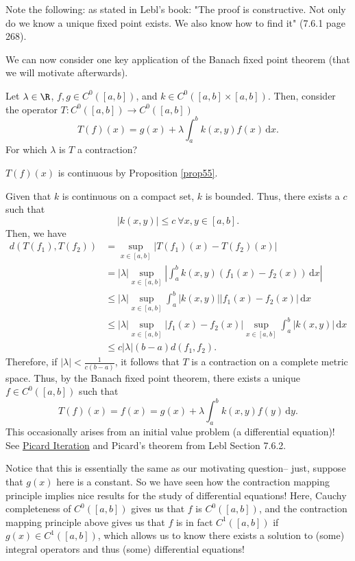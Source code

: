 Note the following: as stated in Lebl's book: "The proof is constructive. Not only do we know a unique fixed point exists. We also know how to find it" (7.6.1 page 268). 

We can now consider one key application of the Banach fixed point theorem (that we will motivate afterwards).

\begin{example}
Let $\lambda \in \R$, $f,g\in C^0([a,b])$, and $k \in C^0([a,b]\times [a,b])$. Then, consider the operator $T: C^0([a,b])\to C^0([a,b])$
\[
T(f)(x) = g(x) + \lambda \int_a^b k(x,y) f(x)\,\mathrm dx.
\]
For which $\lambda$ is $T$ a contraction?
\end{example}

\begin{remark}
    $T(f)(x)$ is continuous by Proposition \ref{prop55}.
\end{remark}
Given that $k$ is continuous on a compact set, $k$ is bounded. Thus, there exists a $c$ such that 
\[
|k(x,y)| \leq c ~\forall x,y \in [a,b].
\]
Then, we have 
\begin{align*}
d(T(f_1), T(f_2)) &= \sup_{x\in [a,b]} |T(f_1)(x) - T(f_2)(x)| \\
&= |\lambda| \sup_{x\in [a,b]} \left|\int_a^b k(x,y) (f_1(x)-f_2(x))\,\mathrm dx\right|  \\
&\leq |\lambda| \sup_{x\in [a,b]} \int_a^b |k(x,y)| |f_1(x)-f_2(x)|\,\mathrm dx  \\
&\leq |\lambda|\sup_{x\in [a,b]}|f_1(x) - f_2(x)|
\sup_{x\in [a,b]} \int_a^b |k(x,y)|\,\mathrm dx \\
&\leq c|\lambda|(b-a) d(f_1, f_2).
\end{align*}
Therefore, if $|\lambda| < \frac{1}{c(b-a)}$, it follows that $T$ is a contraction on a complete metric space. Thus, by the Banach fixed point theorem, there exists a unique $f\in C^0([a,b])$ such that 
\[
T(f)(x) = f(x) = g(x) + \lambda \int_a^b k(x,y)f(y)\,\mathrm dy.
\]
This occasionally arises from an initial value problem (a differential equation)! See \href{https://en.wikipedia.org/wiki/Picard%E2%80%93Lindel%C3%B6f_theorem#Example_of_Picard_iteration}{Picard Iteration} and Picard's theorem from Lebl Section 7.6.2.


Notice that this is essentially the same as our motivating question-- just, suppose that $g(x)$ here is a constant. So we have seen how the contraction mapping principle implies nice results for the study of differential equations! Here, Cauchy completeness of $C^0([a,b])$ gives us that $f$ is $C^0([a,b])$, and the contraction mapping principle above gives us that $f$ is in fact $C^1([a,b])$ if $g(x)\in C^1([a,b])$, which allows us to know there exists a solution to (some) integral operators and thus (some) differential equations!

